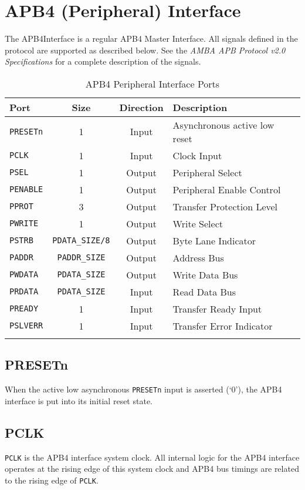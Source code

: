 \section{APB4 (Peripheral)
Interface}\label{apb4-peripheral-interface}

The APB4Interface is a regular APB4 Master Interface. All signals
defined in the protocol are supported as described below. See the
\emph{AMBA APB Protocol v2.0 Specifications} for a complete description
of the signals.

\begin{longtable}[]{@{}lccl@{}}
\toprule
Port & Size & Direction & Description\tabularnewline
\midrule
\endhead
\texttt{PRESETn} & 1                      & Input  & Asynchronous active low reset\tabularnewline
\texttt{PCLK}    & 1                      & Input  & Clock Input\tabularnewline
\texttt{PSEL}    & 1                      & Output & Peripheral Select\tabularnewline
\texttt{PENABLE} & 1                      & Output & Peripheral Enable Control\tabularnewline
\texttt{PPROT}   & 3                      & Output & Transfer Protection Level\tabularnewline
\texttt{PWRITE}  & 1                      & Output & Write Select\tabularnewline
\texttt{PSTRB}   & \texttt{PDATA\_SIZE/8} & Output & Byte Lane Indicator\tabularnewline
\texttt{PADDR}   & \texttt{PADDR\_SIZE}   & Output & Address Bus\tabularnewline
\texttt{PWDATA}  & \texttt{PDATA\_SIZE}   & Output & Write Data Bus\tabularnewline
\texttt{PRDATA}  & \texttt{PDATA\_SIZE}   & Input  & Read Data Bus\tabularnewline
\texttt{PREADY}  & 1                      & Input  & Transfer Ready Input\tabularnewline
\texttt{PSLVERR} & 1                      & Input  & Transfer Error Indicator\tabularnewline
\bottomrule
\caption{APB4 Peripheral Interface Ports}
\end{longtable}

\subsection{PRESETn}\label{presetn}

When the active low asynchronous \texttt{PRESETn} input is asserted (`0'), the
APB4 interface is put into its initial reset state.

\subsection{PCLK}\label{pclk}

\texttt{PCLK} is the APB4 interface system clock. All internal logic for the APB4
interface operates at the rising edge of this system clock and APB4 bus
timings are related to the rising edge of \texttt{PCLK}.

